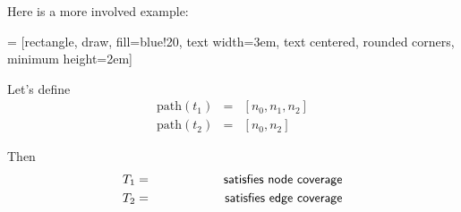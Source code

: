 \documentclass[11pt]{article}
\begin{document}
\newpage
Here is a more involved example:

 = [rectangle, draw, fill=blue!20, 
    text width=3em, text centered, rounded corners, minimum height=2em]

\begin{center}
\end{center}

Let's define
\begin{eqnarray*}
\mbox{path}(t_1) &=& [n_0, n_1, n_2] \\
\mbox{path}(t_2) &=& [n_0, n_2] 
\end{eqnarray*}

Then 
\begin{eqnarray*}
T_1 &=& \hspace*{5em} \mbox{\sf satisfies node coverage}\\
T_2 &=& \hspace*{5em} \mbox{\sf satisfies edge coverage}
\end{eqnarray*}
\end{document}
